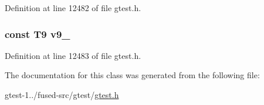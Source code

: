 \-Definition at line 12482 of file gtest.\-h.

\hypertarget{classtesting_1_1internal_1_1ValueArray40_a6356e16cf54a9dfac8525f20242af31e}{
\subsubsection[{v9\-\_\-}]{\setlength{\rightskip}{0pt plus 5cm}const \-T9 {\bf v9\-\_\-}}}\label{d0/d53/classtesting_1_1internal_1_1ValueArray40_a6356e16cf54a9dfac8525f20242af31e}


\-Definition at line 12483 of file gtest.\-h.



\-The documentation for this class was generated from the following file\-:\begin{DoxyCompactItemize}
\item 
gtest-\/1../fused-\/src/gtest/\hyperlink{fused-src_2gtest_2gtest_8h}{gtest.\-h}\end{DoxyCompactItemize}
